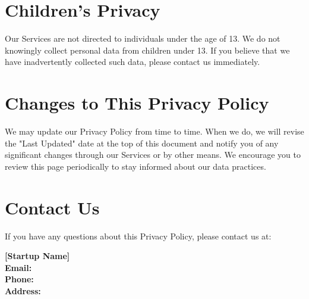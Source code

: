 \documentclass[12pt]{article}
\begin{document}
\section{Children's Privacy}
Our Services are not directed to individuals under the age of 13. We do not knowingly collect personal data from children under 13. If you believe that we have inadvertently collected such data, please contact us immediately.

\section{Changes to This Privacy Policy}
We may update our Privacy Policy from time to time. When we do, we will revise the "Last Updated" date at the top of this document and notify you of any significant changes through our Services or by other means. We encourage you to review this page periodically to stay informed about our data practices.

\section{Contact Us}
If you have any questions about this Privacy Policy, please contact us at:

\begin{center}
    \textbf{[Startup Name]}\\
    \textbf{Email:} \underline{\hspace{6cm}}\\
    \textbf{Phone:} \underline{\hspace{6cm}}\\
    \textbf{Address:} \underline{\hspace{6cm}}
\end{center}
\end{document}
